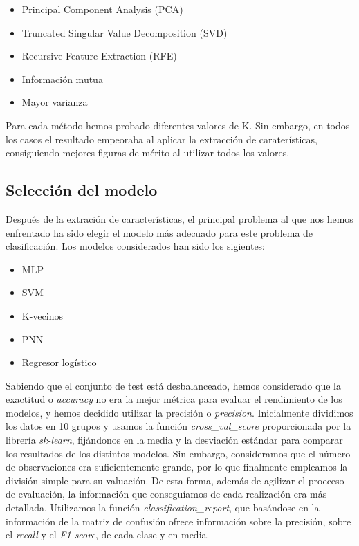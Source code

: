 \documentclass[journal,twoside]{JoPhA}
\begin{document}
\begin{itemize}
	\item Principal Component Analysis (PCA)
	\item Truncated Singular Value Decomposition (SVD)
	\item Recursive Feature Extraction (RFE)
	\item Información mutua
	\item Mayor varianza \\
\end{itemize}

Para cada método hemos probado diferentes valores de K. Sin embargo, en todos los casos el resultado empeoraba al aplicar la extracción de caraterísticas, consiguiendo mejores figuras de mérito al utilizar todos los valores. \\

\subsection{Selección del modelo}
Después de la extración de características, el principal problema al que nos hemos enfrentado ha sido elegir el modelo más adecuado para este problema de clasificación. Los modelos considerados han sido los sigientes: \\

\begin{itemize}
	\item MLP
	\item SVM
	\item K-vecinos
	\item PNN
	\item Regresor logístico \\
\end{itemize} 

Sabiendo que el conjunto de test está desbalanceado, hemos considerado que la exactitud o \textit{accuracy} no era la mejor métrica para evaluar el rendimiento de los modelos, y hemos decidido utilizar la precisión o \textit{precision}. Inicialmente dividimos los datos en 10 grupos y usamos la función \textit{cross\_val\_score} proporcionada por la librería \emph{sk-learn}\cite{validacion_cruzada}, fijándonos en la media y la desviación estándar para comparar los resultados de los distintos modelos. Sin embargo, consideramos que el número de observaciones era suficientemente grande, por lo que finalmente empleamos la división simple para su valuación. De esta forma, además de agilizar el proeceso de evaluación, la información que conseguíamos de cada realización era más detallada. Utilizamos la función \textit{classification\_report}, que basándose en la información de la matriz de confusión ofrece información sobre la precisión, sobre el \textit{recall} y el \textit{F1 score}, de cada clase y en media. \\
\end{document}
